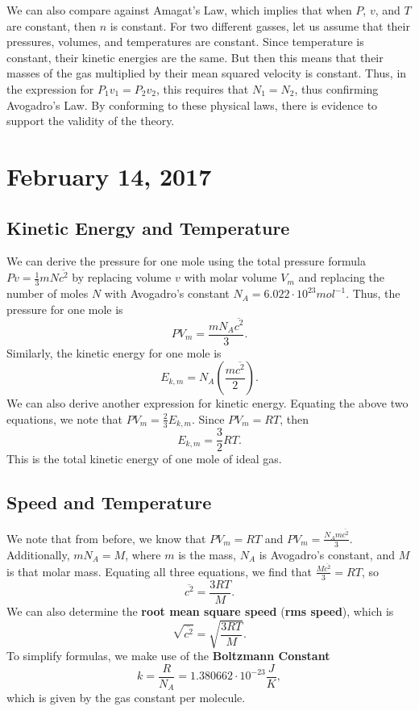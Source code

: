 \documentclass[11pt]{article}
\theoremstyle{plain} %
\theoremstyle{definition}
\theoremstyle{example}
\theoremstyle{remark}
\begin{document}
We can also compare against Amagat's Law, which implies that when $P$, $v$, and $T$ are constant, then $n$ is constant. For two different gasses, let us assume that their pressures, volumes, and temperatures are constant. Since temperature is constant, their kinetic energies are the same. But then this means that their masses of the gas multiplied by their mean squared velocity is constant. Thus, in the expression for $P_1v_1=P_2v_2$, this requires that $N_1=N_2$, thus confirming Avogadro's Law. By conforming to these physical laws, there is evidence to support the validity of the theory.
	
\section{February 14, 2017}
\subsection{Kinetic Energy and Temperature}
	
We can derive the pressure for one mole using the total pressure formula $Pv = \frac{1}{3}mN\overline{c^2}$ by replacing volume $v$ with molar volume $V_m$ and replacing the number of moles $N$ with Avogadro's constant $N_A = 6.022\cdot 10^{23}mol^{-1}$. Thus, the pressure for one mole is 
$$PV_m = \frac{mN_A\overline{c^2}}{3}.$$ Similarly, the kinetic energy for one mole is 
$$E_{k,m} = N_A\left(\frac{m\overline{c^2}}{2}\right).$$
We can also derive another expression for kinetic energy. Equating the above two equations, we note that $PV_m = \frac{2}{3}E_{k,m}$. Since $PV_m = RT$, then 
$$E_{k,m} = \frac{3}{2}RT.$$
This is the total kinetic energy of one mole of ideal gas. 

\subsection{Speed and Temperature}

We note that from before, we know that $PV_m = RT$ and $PV_m = \frac{N_Am\overline{c^2}}{3}$. Additionally, $mN_A = M$, where $m$ is the mass, $N_A$ is Avogadro's constant, and $M$ is that molar mass. Equating all three equations, we find that $\frac{M\overline{c^2}}{3} = RT$, so 
$$\overline{c^2} = \frac{3RT}{M}.$$
We can also determine the \textbf{root mean square speed} (\textbf{rms speed}), which is 
$$\sqrt{\overline{c^2}} = \sqrt{\frac{3RT}{M}}.$$
To simplify formulas, we make use of the \textbf{Boltzmann Constant}
$$k = \frac{R}{N_A} = 1.380662\cdot 10^{-23}\frac{J}{K},$$
which is given by the gas constant per molecule. 
	
\end{document}
